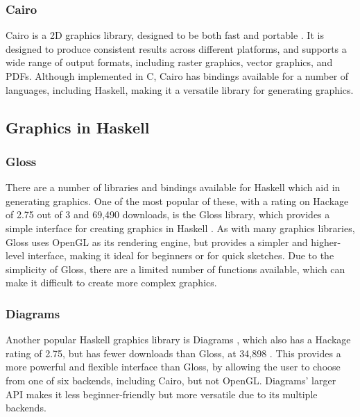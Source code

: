 \documentclass[../main.tex]{subfiles}
\begin{document}
            \subsubsection{Cairo}
                Cairo is a 2D graphics library, designed to be both fast and portable
                    \citep{cairo}.
                It is designed to produce consistent results across different platforms, and
                    supports a wide range of output formats, including raster graphics, vector
                    graphics, and PDFs.
                Although implemented in C, Cairo has bindings available for a number of
                    languages, including Haskell, making it a versatile library for generating
                    graphics.

        \subsection{Graphics in Haskell}
            \subsubsection{Gloss}
                There are a number of libraries and bindings available for Haskell which aid in
                    generating graphics.
                One of the most popular of these, with a rating on Hackage of 2.75 out of 3 and
                    69,490 downloads, is the Gloss library, which provides a simple interface for
                    creating graphics in Haskell \citep{hackageGloss}.
                As with many graphics libraries, Gloss uses OpenGL as its rendering engine, but
                    provides a simpler and higher-level interface, making it ideal for beginners or
                    for quick sketches.
                Due to the simplicity of Gloss, there are a limited number of functions
                    available, which can make it difficult to create more complex graphics.

            \subsubsection{Diagrams}
                Another popular Haskell graphics library is Diagrams \citep{hackageDiagrams},
                    which also has a Hackage rating of 2.75, but has fewer downloads than Gloss, at
                    34,898 \citep{hackageDiagrams}.
                This provides a more powerful and flexible interface than Gloss, by allowing
                    the user to choose from one of six backends, including Cairo, but not OpenGL.
                Diagrams' larger API makes it less beginner-friendly but more versatile due to
                    its multiple backends.
\end{document}
